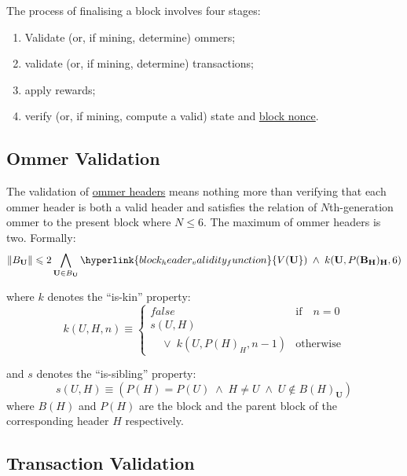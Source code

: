 \documentclass[9pt,oneside]{amsart}
\begin{document}
\begin{multicols}{2}
The process of finalising a block involves four stages:

\begin{enumerate}
\item Validate (or, if mining, determine) ommers;
\item validate (or, if mining, determine) transactions;
\item apply rewards;
\item verify (or, if mining, compute a valid) state and \hyperlink{block_nonce}{block nonce}.
\end{enumerate}

\subsection{Ommer Validation}

The validation of \hyperlink{ommer_block_headers_B__U}{ommer headers} means nothing more than verifying that each ommer header is both a valid header and satisfies the relation of $N$th-generation ommer to the present block where $N \leq 6$. The maximum of ommer headers is two. Formally:
\begin{equation}
\lVert B_{\mathbf{U}} \rVert \leqslant 2 \bigwedge_{\mathbf{U} \in B_{\mathbf{U}}} \hyperlink{block_header_validity_function}{V({\mathbf{U}}})\; \wedge \; k({\mathbf{U}}, P(\mathbf{B}_{\mathbf{H}})_{\mathbf{H}}, 6)
\end{equation}

where $k$ denotes the ``is-kin'' property:
\begin{equation}
k(U, H, n) \equiv \begin{cases} false & \text{if} \quad n = 0 \\
s(U, H) &\\
\quad \vee \; k(U, P(H)_{H}, n - 1) & \text{otherwise}
\end{cases}
\end{equation}

and $s$ denotes the ``is-sibling'' property:
\begin{equation}
s(U, H) \equiv (P(H) = P(U)\; \wedge \; H \neq U \; \wedge \; U \notin B(H)_{\mathbf{U}})
\end{equation}
where $B(H)$ and $P(H)$ are the block and the parent block of the corresponding header $H$ respectively.

\subsection{Transaction Validation}


\end{multicols}
\end{document}
